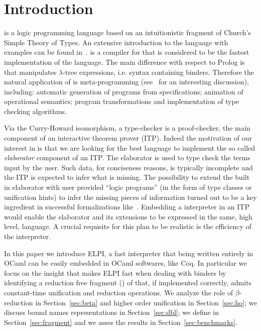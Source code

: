 \documentclass{llncs}
\begin{document}
\section{Introduction}%
\lp{} is a logic programming language based on an intuitionistic fragment of
Church's Simple Theory of Types. An extensive introduction to the language
with examples can be found in~\cite{Miller:2012:PHL:2331097}. \tedius{}
\cite{DBLP:conf/cade/NadathurM99,DBLP:journals/corr/abs-0911-5203} is a
compiler for \lp{} %
that is considered to be the fastest
implementation of the language. 
The main difference with respect to Prolog is that \lp{} manipulates
$\lambda$-tree expressions, i.e. syntax containing binders. Therefore the
natural application of \lp{} is meta-programming (see~\cite{LPAZ} for
an interesting discussion), including: automatic generation of programs from
specifications; animation of operational semantics;
program transformations and implementation of type checking algorithms.

Via the Curry-Howard isomorphism, a type-checker is a proof-checker, the main
component of an interactive theorem prover (ITP). Indeed the motivation of our
interest in \lp{} is that we are looking for the best 
language to implement the so called \emph{elaborator} component of an ITP.
The elaborator is used to type check the terms input by
the user.  Such data, for conciseness reasons, is typically incomplete and
the ITP is expected to infer what is missing.  The possibility to
extend the built in elaborator with user provided ``logic programs'' (in the
form of type classes or unification hints) to infer the missing pieces of
information turned out to be a key ingredient in successful formalizations
like~\cite{gonthier:hal-00816699}.  Embedding a \lp{} interpreter in an ITP 
would enable the elaborator and its extensions to be expressed in the same,
high level, language.  A crucial requisite for this plan to be realistic is
the efficiency of the \lp{} interpreter.

In this paper we introduce ELPI, a fast \lp{} interpreter that being written
entirely in OCaml can be easily embedded in OCaml softwares, like Coq.
In particular we focus on the insight that makes ELPI fast when dealing with
binders by identifying a reduction free fragment (\rff{}) of \lp{} that, if
implemented correctly, admits constant-time unification and reduction
operations.
We analyze the role  of $\beta$-reduction in Section~\ref{sec:beta} and
higher order unification in Section~\ref{sec:ho}; we discuss bound names
representations in Section~\ref{sec:dbl}; we define \rff{} 
in Section~\ref{sec:fragment} and we asses the results in
Section~\ref{sec:benchmarks}.
\end{document}
